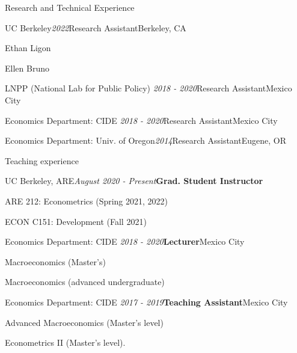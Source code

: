 \documentclass{resume} %
\begin{document}
\begin{rSection}{Research and Technical Experience}

\begin{rSubsection}{UC Berkeley}{\textit{2022}}{Research Assistant}{Berkeley, CA}
    \item Ethan Ligon
    \item Ellen Bruno
\end{rSubsection}

\begin{rSubsection}{LNPP (National Lab for Public Policy)}{\textit{ 2018 - 2020}}{Research Assistant}{Mexico City}
\end{rSubsection}


\begin{rSubsection}{Economics Department: CIDE}{\textit{ 2018 -  2020}}{Research Assistant}{Mexico City}
\end{rSubsection}

\begin{rSubsection}{Economics Department: Univ. of Oregon}{\textit{2014}}{Research Assistant}{Eugene, OR}
\end{rSubsection}
\end{rSection}


\begin{rSection}{Teaching experience}

\begin{rSubsection}{UC Berkeley, ARE}{\textit{August 2020 - Present}}{\textbf{Grad. Student Instructor}}{}
\item ARE 212: Econometrics (Spring 2021, 2022)
\item ECON C151: Development (Fall 2021)
\end{rSubsection}

\begin{rSubsection}{Economics Department: CIDE}{\textit{ 2018 -  2020}}{\textbf{Lecturer}}{Mexico City}
\item Macroeconomics (Master's)
\item Macroeconomics (advanced undergraduate)
\end{rSubsection}

\begin{rSubsection}{Economics Department: CIDE}{\textit{ 2017 - 2019}}{\textbf{Teaching Assistant}}{Mexico City}
\item Advanced Macroeconomics (Master's level) 
\item Econometrics II (Master's level).
\end{rSubsection}

\end{rSection}
\end{document}
